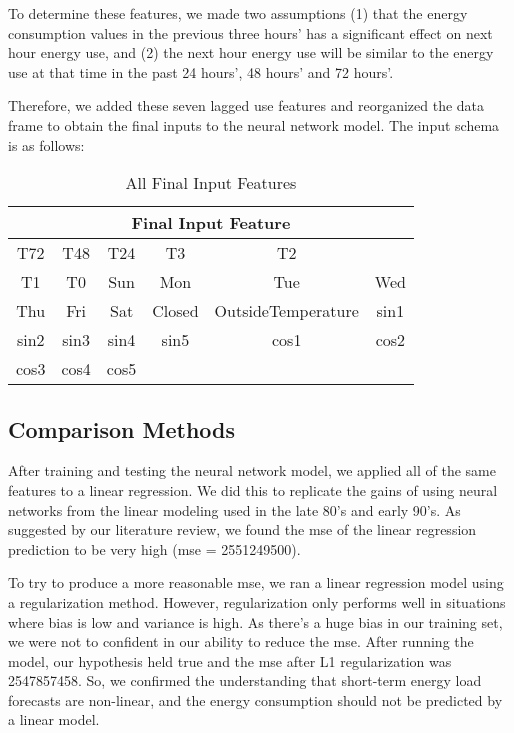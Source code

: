 \documentclass[twoside,11pt]{article}
\begin{document}
To determine these features, we made two assumptions (1) that the energy consumption values in the previous three hours' has a significant effect on next hour energy use, and (2) the next hour energy use will be similar to the energy use at that time in the past 24 hours', 48 hours' and 72 hours'. 

Therefore, we added these seven lagged use features and reorganized the data frame to obtain the final inputs to the neural network model. The input schema is as follows:

\begin{table}[!htbp]
\centering 
\begin{tabular}{ |c|c|c|c|c|c|}
\hline
\multicolumn{6}{|c|}{Final Input Feature} \\
 \hline
T72 & T48 & T24 & T3 & T2 & \\ 
 T1 & T0 & Sun & Mon & Tue & Wed\\ 
 Thu & Fri & Sat & Closed & OutsideTemperature & sin1\\ 
 sin2 & sin3 & sin4 & sin5 & cos1 & cos2\\ 
 cos3 & cos4 & cos5 &  &  & \\ 
 \hline
\end{tabular}
\label{tab:example} 
    \caption{All Final Input Features} 
\end{table}
\FloatBarrier

\subsection{Comparison Methods}

After training and testing the neural network model, we applied all of the same features to a linear regression. We did this to replicate the gains of using neural networks from the linear modeling used in the late 80's and early 90's. As suggested by our literature review, we found the mse of the linear regression prediction to be very high (mse = 2551249500). 

To try to produce a more reasonable mse, we ran a linear regression model using a regularization method. However, regularization only performs well in situations where bias is low and variance is high. As there's a huge bias in our training set, we were not to confident in our ability to reduce the mse. After running the model, our hypothesis held true and the mse after L1 regularization was 2547857458. So, we confirmed the understanding that short-term energy load forecasts are non-linear, and the energy consumption should not be predicted by a linear model.
\end{document}
